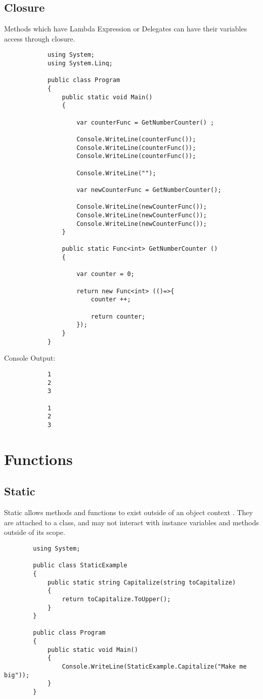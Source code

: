 \documentclass {amsart}
\begin{document}
		\subsection {Closure} Methods which have Lambda Expression or Delegates can have their variables access through closure.
			\begin{lstlisting}
			using System;
			using System.Linq;

			public class Program
			{
				public static void Main()
				{

					var counterFunc = GetNumberCounter() ;

					Console.WriteLine(counterFunc());
					Console.WriteLine(counterFunc());
					Console.WriteLine(counterFunc());
					
					Console.WriteLine("");
					
					var newCounterFunc = GetNumberCounter();
					
					Console.WriteLine(newCounterFunc());
					Console.WriteLine(newCounterFunc());
					Console.WriteLine(newCounterFunc());
				}
				
				public static Func<int> GetNumberCounter () 
				{
					
					var counter = 0; 
					
					return new Func<int> (()=>{
						counter ++;
						
						return counter;
					});
				}
			}
			\end{lstlisting}
			Console Output: 
			\begin{verbatim}
			1
			2
			3

			1
			2
			3
			\end{verbatim}
	
\section{Functions}


	\subsection{Static}  Static allows methods and functions to exist outside of an object context . They are attached to a class, and may not interact with instance variables and methods outside of its scope.  
		\begin{lstlisting}
		using System;

		public class StaticExample 
		{
			public static string Capitalize(string toCapitalize)
			{
				return toCapitalize.ToUpper();
			}
		}

		public class Program
		{
			public static void Main()
			{
				Console.WriteLine(StaticExample.Capitalize("Make me big"));
			}
		}

		\end{lstlisting}
\end{document}
